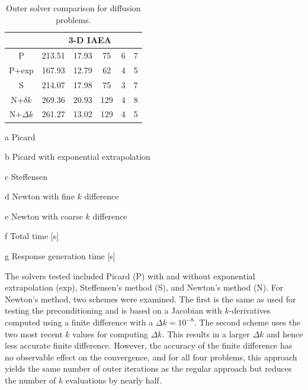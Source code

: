 \begin{table}[!]
\begin{center}
\begin{threeparttable}
\begin{tabular}{cccccc}
 \midrule 
 &  \multicolumn{5}{c}{3-D IAEA} \\ 
 \midrule 
        P &    213.51 &     17.93 &           75 &            6 &            7 \\ 
    P+exp &    167.93 &     12.79 &           62 &            4 &            5 \\ 
    S &    214.07 &     17.98 &           75 &            3 &            7 \\ 
  N+$\delta k$ &    269.36 &     20.93 &          129 &            4 &            8 \\ 
  N+$\Delta k$ &    261.27 &     13.02 &          129 &            4 &            5 \\ 
 \bottomrule 
 \end{tabular} 

 {\footnotesize
 \begin{tablenotes}
   \item[a] Picard 
   \item[b] Picard with exponential extrapolation
   \item[c] Steffensen
   \item[d] Newton with fine $k$ difference
   \item[e] Newton with coarse $k$ difference
   \item[f] Total time [s]
   \item[g] Response generation time [s]
 \end{tablenotes}
 }
 \end{threeparttable}
 
 \end{center} 
 
 \caption{Outer solver comparison for diffusion problems.} 
 \label{tbl:diffusion_outer_study} 
 
\end{table} 


The solvers tested included Picard (P) with and without exponential 
extrapolation (exp), Steffensen's method (S), and Newton's method (N).
For Newton's method, two schemes were examined.  The first is the same 
as used for testing the preconditioning and is based on a Jacobian with 
$k$-derivatives computed using a finite difference 
with a $\Delta k = 10^{-8}$.
The second scheme uses the two most recent $k$ values
for computing $\Delta k$.  This results in a larger $\Delta k$ and hence 
less accurate finite difference.  However, the accuracy of the finite 
difference has no observable effect on the convergence, 
and for all four problems,
this approach yields the same number of outer iterations as the 
regular approach but reduces the number of $k$ evaluations by nearly half.

